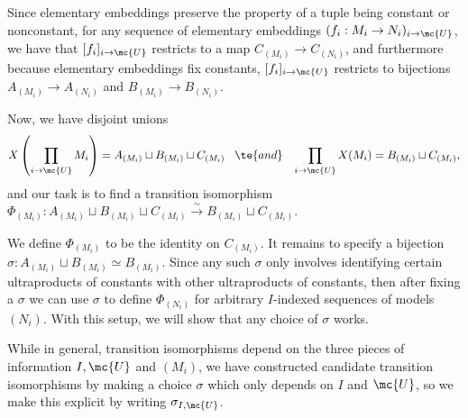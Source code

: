   Since elementary embeddings preserve the property of a tuple being constant or nonconstant, for any sequence of elementary embeddings $(f_i : M_i \to N_i)_{i \to \mc{U}}$, we have that $[f_i]_{i \to \mc{U}}$ restricts to a map $C_{(M_i)} \to C_{(N_i)}$, and furthermore because elementary embeddings fix constants, $[f_i]_{i \to \mc{U}}$ restricts to bijections $A_{(M_i)} \to A_{(N_i)}$ and $B_{(M_i)} \to B_{(N_i)}$.

Now, we have disjoint unions
  $$
  X \left(\prod_{i \to \mc{U}} M_i \right) = A_{(M_i)} \sqcup B_{(M_i)} \sqcup C_{(M_i)} \hspace{3mm} \te{ and } \hspace{3mm} \prod_{i \to \mc{U}} X(M_i) = B_{(M_i)} \sqcup C_{(M_i)},
  $$
  and our task is to find a transition isomorphism $\Phi_{(M_i)} : A_{(M_i)} \sqcup B_{(M_i)} \sqcup C_{(M_i)} \overset{\sim}{\longrightarrow} B_{(M_i)} \sqcup C_{(M_i)}$.

We define $\Phi_{(M_i)}$ to be the identity on $C_{(M_i)}$. It remains to specify a bijection $\sigma : A_{(M_i)} \sqcup B_{(M_i)} \simeq B_{(M_i)}$. Since any such $\sigma$ only involves identifying certain ultraproducts of constants with other ultraproducts of constants, then after fixing a $\sigma$ we can use $\sigma$ to define $\Phi_{(N_i)}$ for arbitrary $I$-indexed sequences of models $(N_i)$. With this setup, we will show that any choice of $\sigma$ works.

  While in general, transition isomorphisms depend on the three pieces of information $I, \mc{U}$ and $(M_i)$, we have constructed candidate transition isomorphisms by making a choice $\sigma$ which only depends on $I$ and $\mc{U}$, so we make this explicit by writing $\sigma_{I, \mc{U}}$.


